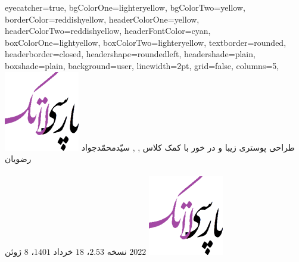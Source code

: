 \documentclass[landscape,debug,paperwidth=1510mm, paperheight=955mm,]{xebaposter}
\begin{document}
      \begin{poster}%
      {
      eyecatcher=true,
      bgColorOne=lighteryellow,%
      bgColorTwo=yellow,
      borderColor=reddishyellow,
      headerColorOne=yellow,
      headerColorTwo=reddishyellow,
      headerFontColor=cyan,
      boxColorOne=lightyellow,
      boxColorTwo=lighteryellow,
      textborder=rounded,
      headerborder=closed,
      headershape=roundedleft,
      headershade=plain,
      boxshade=plain,
      background=user,
      linewidth=2pt,
      grid=false, %
      columns=5,
      }
 {
      \includegraphics[height=0.05\textheight]{logo}
 }
 {طراحی پوستری زیبا و در خور با کمک کلاس 
}
 {\large {}, , سیّدمحمّدجواد رضویان
 \\%
 {\normalsize\texttt{}
 \\
نسخه $2.53$، $18$ خرداد $1401$، $8$ ژوئن $2022$
 }}
 {
    \includegraphics[height=0.05\textheight]{logo}
 }


\end{poster}
\end{document}
